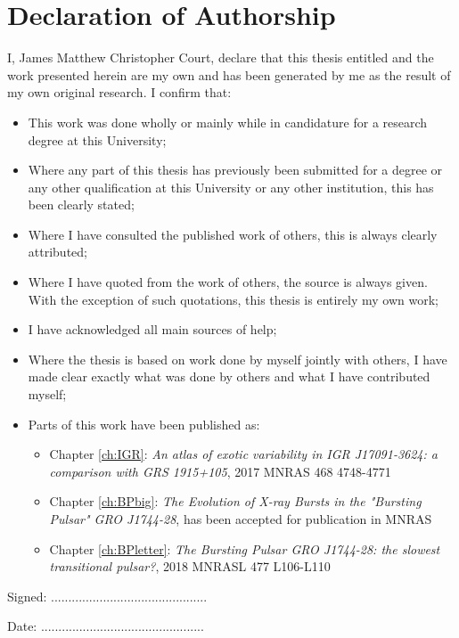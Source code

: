 \chapter*{Declaration of Authorship}




I, James Matthew Christopher Court, declare that this thesis entitled \textit{\thesistitle} and the work presented herein are my own and has been generated by me as the result of my own original research. I confirm that:

\begin{itemize}
	\item{This work was done wholly or mainly while in candidature for a research degree at this University;}
	\item{Where any part of this thesis has previously been submitted for a degree or any other qualification at this University or any other institution, this has been clearly stated;}
	\item{Where I have consulted the published work of others, this is always clearly attributed;}
	\item{Where I have quoted from the work of others, the source is always given. With the exception of such quotations, this thesis is entirely my own work;}
	\item{I have acknowledged all main sources of help;}
	\item{Where the thesis is based on work done by myself jointly with others, I have made clear exactly what was done by others and what I have contributed myself;}
	\item{Parts of this work have been published as:}
\begin{itemize}
		\item{Chapter \ref{ch:IGR}: \textit{	
	An atlas of exotic variability in IGR J17091-3624: a comparison with GRS 1915+105}, 2017 MNRAS 468 4748-4771}
		\item{Chapter \ref{ch:BPbig}: \textit{The Evolution of X-ray Bursts in the "Bursting Pulsar" GRO J1744-28}, has been accepted for publication in MNRAS}
		\item{Chapter \ref{ch:BPletter}: \textit{The Bursting Pulsar GRO J1744-28: the slowest transitional pulsar?}, 2018 MNRASL 477 L106-L110}
\end{itemize}
\end{itemize}


Signed: .............................................

Date: ...............................................